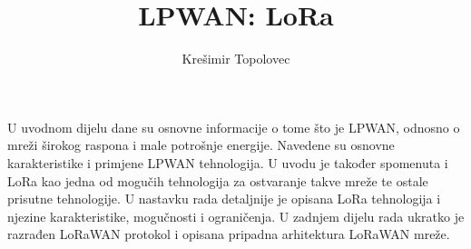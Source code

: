 \documentclass[times, utf8, seminar, numeric]{fer}
\begin{document}
\setcounter{secnumdepth}{3} 
\setcounter{tocdepth}{4}
\nocite{*}

\title{LPWAN: LoRa}

\author{Krešimir Topolovec}


\maketitle

\tableofcontents









\nocite{lora_app_note}

\begin{sazetak}
U uvodnom dijelu dane su osnovne informacije o tome što je LPWAN, odnosno o mreži širokog raspona i male potrošnje energije. Navedene su osnovne karakteristike i primjene LPWAN tehnologija. U uvodu je također spomenuta i LoRa kao jedna od mogučih tehnologija za ostvaranje takve mreže te ostale prisutne tehnologije. U nastavku rada detaljnije je opisana LoRa tehnologija i njezine karakteristike, mogučnosti i ograničenja. U zadnjem dijelu rada ukratko je razrađen  LoRaWAN protokol i opisana pripadna arhitektura LoRaWAN mreže.
\newline
\linebreak
{}
\end{sazetak}
\end{document}
